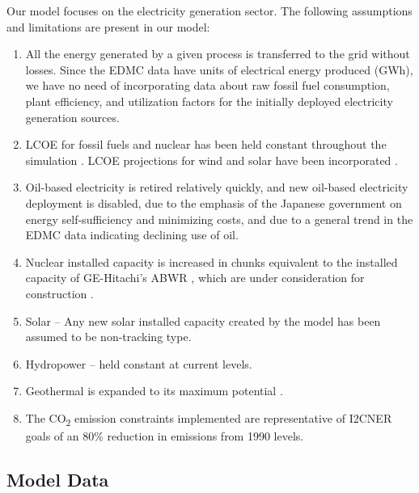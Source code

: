 \documentclass[14pt,a4paper]{article} %
\begin{document}
Our model focuses on the electricity generation sector. The following assumptions and limitations are present in our model:
	
\begin{enumerate}

\item All the energy generated by a given process is transferred to the grid without losses. Since the \gls{EDMC} data have units of electrical energy produced (GWh), we have no need of incorporating data about raw fossil fuel consumption, plant efficiency, and utilization factors for the initially deployed electricity generation sources.

\item \gls{LCOE} for fossil fuels and nuclear has been held constant throughout the simulation \cite{chapman_energy_2018,noauthor_lazards_2017,noauthor_iea_2017}. \gls{LCOE} projections for wind and solar have been incorporated \cite{noauthor_lazards_2017}.

\item Oil-based electricity is retired relatively quickly, and new oil-based electricity deployment is disabled, due to the emphasis of the Japanese government on energy self-sufficiency and minimizing costs, and due to a general trend in the \gls{EDMC} data \cite{noauthor_energy_2018} indicating declining use of oil.

\item Nuclear installed  capacity is increased in chunks equivalent to the installed  capacity of GE-Hitachi's \gls{ABWR} \cite{ge_advanced_2007}, which are under consideration for construction \cite{noauthor_electricity_2017}.

\item Solar – Any new solar installed  capacity created by the model has been assumed to be non-tracking type.

\item Hydropower – held constant at current levels.

\item Geothermal is expanded to its maximum potential \cite{noauthor_geothermal_2018}.

\item The CO\textsubscript{2} emission constraints implemented are representative of \gls{I2CNER} goals of an 80\% reduction in emissions from 1990 levels.
\end{enumerate}

\subsection{Model Data}
\end{document}
